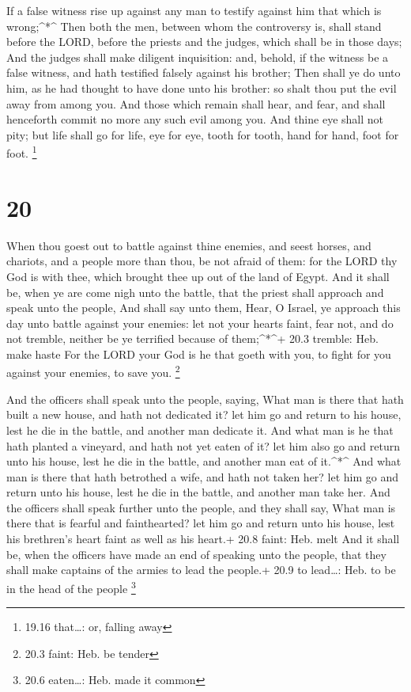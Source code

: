  If a false witness rise up against any man to testify
against him that which is wrong;\^{}*\^{}  Then both the
men, between whom the controversy is, shall stand before the LORD,
before the priests and the judges, which shall be in those days;
 And the judges shall make diligent inquisition: and,
behold, if the witness be a false witness, and hath testified falsely
against his brother;  Then shall ye do unto him, as he had
thought to have done unto his brother: so shalt thou put the evil away
from among you.  And those which remain shall hear, and
fear, and shall henceforth commit no more any such evil among you.
 And thine eye shall not pity; but life shall go for life,
eye for eye, tooth for tooth, hand for hand, foot for foot. \footnote{19.16
  that\ldots: or, falling away}

\hypertarget{section-19}{%
\section{20}\label{section-19}}

 When thou goest out to battle against thine enemies, and
seest horses, and chariots, and a people more than thou, be not afraid
of them: for the LORD thy God is with thee, which brought thee up out of
the land of Egypt.  And it shall be, when ye are come nigh
unto the battle, that the priest shall approach and speak unto the
people,  And shall say unto them, Hear, O Israel, ye
approach this day unto battle against your enemies: let not your hearts
faint, fear not, and do not tremble, neither be ye terrified because of
them;\^{}*\^{}+ 20.3 tremble: Heb. make haste  For the LORD
your God is he that goeth with you, to fight for you against your
enemies, to save you. \footnote{20.3 faint: Heb. be tender}

 And the officers shall speak unto the people, saying, What
man is there that hath built a new house, and hath not dedicated it? let
him go and return to his house, lest he die in the battle, and another
man dedicate it.  And what man is he that hath planted a
vineyard, and hath not yet eaten of it? let him also go and return unto
his house, lest he die in the battle, and another man eat of
it.\^{}*\^{}  And what man is there that hath betrothed a
wife, and hath not taken her? let him go and return unto his house, lest
he die in the battle, and another man take her.  And the
officers shall speak further unto the people, and they shall say, What
man is there that is fearful and fainthearted? let him go and return
unto his house, lest his brethren's heart faint as well as his heart.+
20.8 faint: Heb. melt  And it shall be, when the officers
have made an end of speaking unto the people, that they shall make
captains of the armies to lead the people.+ 20.9 to lead\ldots: Heb. to
be in the head of the people \footnote{20.6 eaten\ldots: Heb. made it
  common}

